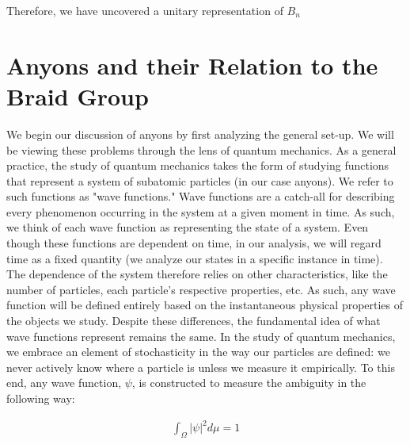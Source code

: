 Therefore, we have uncovered a unitary representation of $B_n$

\section{Anyons and their Relation to the Braid Group}

We begin our discussion of anyons by first analyzing the general set-up. We will be viewing these problems through the lens of quantum mechanics. As a general practice, the study of quantum mechanics takes the form of studying functions that represent a system of subatomic particles (in our case anyons). We refer to such functions as "wave functions." Wave functions are a catch-all for describing every phenomenon occurring in the system at a given moment in time. As such, we think of each wave function as representing the state of a system. Even though these functions are dependent on time, in our analysis, we will regard time as a fixed quantity (we analyze our states in a specific instance in time). The dependence of the system therefore relies on other characteristics, like the number of particles, each particle's respective properties, etc. As such, any wave function will be defined entirely based on the instantaneous physical properties of the objects we study. Despite these differences, the fundamental idea of what wave functions represent remains the same. In the study of quantum mechanics, we embrace an element of stochasticity in the way our particles are defined: we never actively know where a particle is unless we measure it empirically. To this end, any wave function, $\psi$, is constructed to measure the ambiguity in the following way:

\begin{equation}
	\begin{aligned}
		\int_\Omega |\psi|^2 d\mu = 1
	\end{aligned}
\end{equation}

